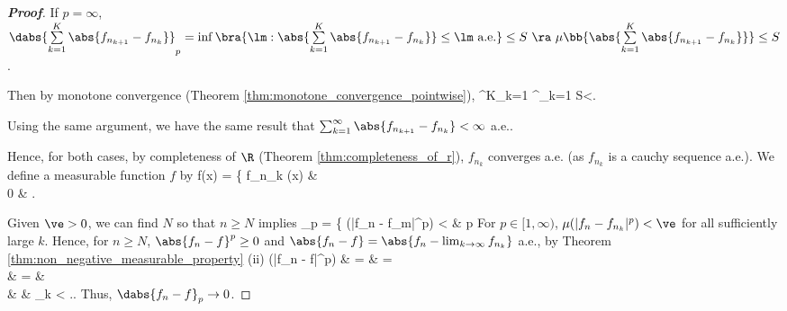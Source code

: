 \begin{proof}[\bf Proof]
\item [(ii)] If $p=\infty$, $\dabs{\sum\limits^K_{k=1}\abs{f_{n_{k+1}} - f_{n_k}}}_p = \inf\bra{\lm : \abs{\sum\limits^K_{k=1}\abs{f_{n_{k+1}} - f_{n_k}}}\leq \lm \text{ a.e.}} \leq S \ \ra\  \mu\bb{\abs{\sum\limits^K_{k=1}\abs{f_{n_{k+1}} - f_{n_k}}}}\leq S$.

Then by monotone convergence (Theorem \ref{thm:monotone_convergence_pointwise}),
\be
\sum^K_{k=1}  \ua \sum^\infty_{k=1}  \quad\ra\quad \mu{} \ua \mu{} \leq S<\infty.
\ee

Using the same argument, we have the same result that $\sum^\infty_{k=1} \abs{f_{n_{k+1}} - f_{n_k}} < \infty$ a.e..
\een

Hence, for both cases, by completeness of $\R$ (Theorem \ref{thm:completeness_of_r}), $f_{n_k}$ converges a.e. (as $f_{n_k}$ is a cauchy sequence a.e.). We define a measurable function $f$ by
\be
f(x) = \left\{
\lim f_{n_k} (x) \quad \quad & \\
0 & 
\ea\right.
\ee

Given $\ve > 0$, we can find $N$ so that $n \geq N$ implies
\be
{}_p = \left\{
\mu(|f_n - f_m|^p) < \ve\quad\quad & p \in [1,\infty)\\
\inf\bra{\lm:\abs{f_n - f_m} \leq \lm \text{ a.e.}} < \ve\quad\quad & p =\infty
\ea\right.\quad \text{for all }m \geq n,
\ee

\ben
\item [(i)] For $p\in [1,\infty)$, $\mu(|f_n - f_{n_k}|^p) < \ve$ for all sufficiently large $k$. Hence, for $n \geq N$, $\abs{f_n-f}^p \geq 0$ and $\abs{f_n -f} = \abs{f_n - \lim_{k\to \infty} f_{n_k}}$ a.e., by Theorem \ref{thm:non_negative_measurable_property} (ii)
\beast
\mu(|f_n - f|^p) & = & \mu{} = \mu{}  \\
& = & \mu{} \quad{}\\
& \leq & \liminf_{k\to \infty} \mu{} < \ve.\quad {}.
\eeast
Thus, $\dabs{f_n - f}_p \to 0$.


\end{proof}
